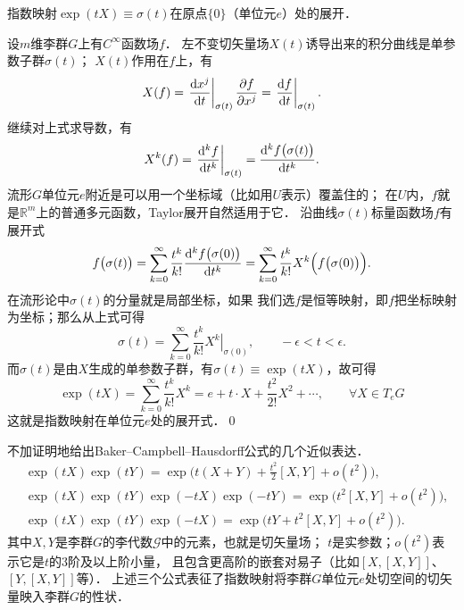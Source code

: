 \begin{example}
    指数映射$\exp(t X)\equiv \sigma(t)$在原点$\{0\}$（单位元$e$）处的展开．
\end{example}
设$m$维李群$G$上有$C^\infty$函数场$f$．
左不变切矢量场$X(t)$诱导出来的积分曲线是单参数子群$\sigma(t)$；%
$X(t)$作用在$f$上，有
\begin{equation}
    X(f) = \left.\frac{{\rm d} x^j}{{\rm d} t}\right|_{\sigma(t)}
     \frac{\partial f}{\partial x^j}
     = \left.\frac{{\rm d} f}{{\rm d} t}\right|_{\sigma(t)} .
\end{equation}
继续对上式求导数，有
\begin{equation}
    X^k(f) = \left.\frac{{\rm d}^k f}{{\rm d} t^k}\right|_{\sigma(t)} 
      = \frac{{\rm d}^k f\bigl(\sigma(t)\bigr)}{{\rm d} t^k}.
\end{equation}
流形$G$单位元$e$附近是可以用一个坐标域（比如用$U$表示）覆盖住的；
在$U$内，$f$就是$\mathbb{R}^m$上的普通多元函数，Taylor展开自然适用于它．
沿曲线$\sigma(t)$标量函数场$f$有展开式
\begin{equation}
    f\bigl(\sigma(t)\bigr) = \sum_{k=0}^{\infty}  \frac{t^k}{k!}
    \frac{{\rm d}^k f\bigl(\sigma(0)\bigr)}{{\rm d} t^k}
    =\sum_{k=0}^{\infty}  \frac{t^k}{k!}   X^k \Bigl(f\bigl(\sigma(0)\bigr)\Bigr).
\end{equation}
在流形论中$\sigma(t)$的分量就是局部坐标，如果
我们选$f$是恒等映射，即$f$把坐标映射为坐标；那么从上式可得
\begin{equation}
    \sigma(t) = \sum_{k=0}^{\infty} \frac{t^k}{k!} \left. X^k\right|_{\sigma(0)},
    \qquad -\epsilon < t <\epsilon .
\end{equation}
而$\sigma(t)$是由$X$生成的单参数子群，有$\sigma(t)\equiv \exp(tX)$，故可得
\begin{equation}\label{chlg:eqn_exp-pand}
    \exp(t X) = \sum_{k=0}^{\infty} \frac{t^k}{k!} X^k = e + t\cdot X 
      + \frac{t^2}{2!} X^2 + \cdots, \qquad \forall X\in T_e G
\end{equation}
这就是指数映射在单位元$e$处的展开式．\qed


不加证明地给出Baker--Campbell--Hausdorff公式\cite[\S 3.8]{huangxg-2024}的几个近似表达． 
\begin{align}
    &\exp(tX) \exp(tY) = \exp\bigl(t(X+Y)+\frac{t^2}{2} [X,Y]+o(t^2)\bigr), \label{chlg:eqn_BCH-xy} \\
    &\exp(tX) \exp(tY) \exp(-tX) \exp(-tY) =  \exp\bigl(t^2[X,Y]+o(t^2)\bigr), \label{chlg:eqn_BCH-xy-x-y} \\
    &\exp(tX) \exp(tY) \exp(-tX) =  \exp\bigl(tY+t^2[X,Y]+o(t^2)\bigr) . \label{chlg:eqn_BCH-xy-x}
\end{align}
其中$X,Y$是李群$G$的李代数$\mathscr{G}$中的元素，也就是切矢量场；
$t$是实参数；$o(t^2)$表示它是$t$的3阶及以上阶小量，
且包含更高阶的嵌套对易子（比如$[X,[X,Y]]$、$[Y,[X,Y]]$等）．
上述三个公式表征了指数映射将李群$G$单位元$e$处切空间的切矢量映入李群$G$的性状．



